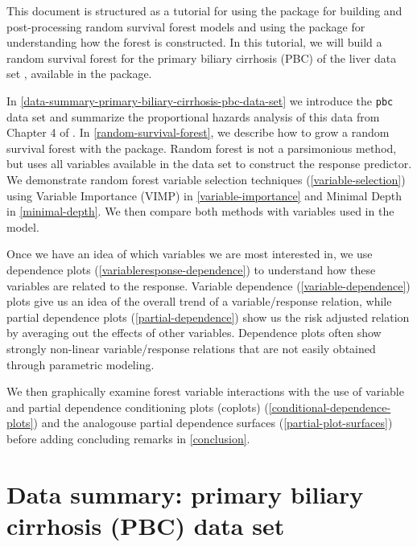 \documentclass[article]{jss}
\begin{document}
This document is structured as a tutorial for using the
 package for building and post-processing random
survival forest models and using the  package for
understanding how the forest is constructed. In this tutorial, we will
build a random survival forest for the primary biliary cirrhosis (PBC)
of the liver data set \citep{fleming:1991}, available in the
 package.

In \autoref{data-summary-primary-biliary-cirrhosis-pbc-data-set} we
introduce the \texttt{pbc} data set and summarize the proportional
hazards analysis of this data from Chapter 4 of \citep{fleming:1991}. In
\autoref{random-survival-forest}, we describe how to grow a random
survival forest with the  package. Random forest is
not a parsimonious method, but uses all variables available in the data
set to construct the response predictor. We demonstrate random forest
variable selection techniques (\autoref{variable-selection}) using
Variable Importance (VIMP) \citep{Breiman:2001} in
\autoref{variable-importance} and Minimal Depth \citep{Ishwaran:2010} in
\autoref{minimal-depth}. We then compare both methods with variables
used in the \citep{fleming:1991} model.

Once we have an idea of which variables we are most interested in, we
use dependence plots \citep{Friedman:2000}
(\autoref{variableresponse-dependence}) to understand how these
variables are related to the response. Variable dependence
(\autoref{variable-dependence}) plots give us an idea of the overall
trend of a variable/response relation, while partial dependence plots
(\autoref{partial-dependence}) show us the risk adjusted relation by
averaging out the effects of other variables. Dependence plots often
show strongly non-linear variable/response relations that are not easily
obtained through parametric modeling.

We then graphically examine forest variable interactions with the use of
variable and partial dependence conditioning plots (coplots)
\citep{chambers:1992, cleveland:1993}
(\autoref{conditional-dependence-plots}) and the analogouse partial
dependence surfaces (\autoref{partial-plot-surfaces}) before adding
concluding remarks in \autoref{conclusion}.

\section{Data summary: primary biliary cirrhosis (PBC) data
set}\label{data-summary-primary-biliary-cirrhosis-pbc-data-set}
\end{document}
